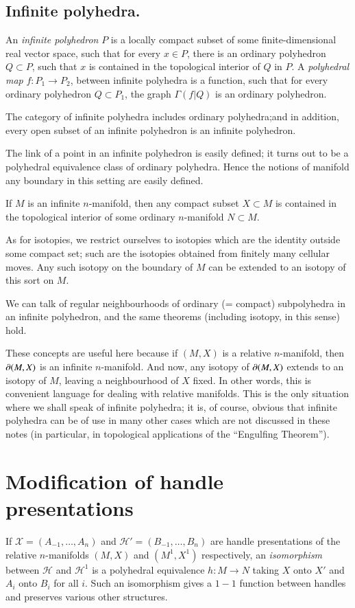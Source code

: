 \subsection{Infinite polyhedra.}\label{chap8-sec8.3.8}
An {\em infinite polyhedron} $P$ is a locally compact subset of some finite-dimensional real vector space, such that for every $x\in P$, there is an ordinary polyhedron $Q\subset P$, such that $x$ is contained in the topological interior of $Q$ in $P$. A {\em polyhedral map} $f:P_{1}\to P_{2}$, between infinite polyhedra is a function, such that for every ordinary polyhedron $Q\subset P_{1}$, the graph $\Gamma(f|Q)$ is an ordinary polyhedron.

The category of infinite polyhedra includes ordinary polyhedra;\pageoriginale and in addition, every open subset of an infinite polyhedron is an infinite polyhedron.

The link of a point in an infinite polyhedron is easily defined; it turns out to be a polyhedral equivalence class of ordinary polyhedra. Hence the notions of manifold any boundary in this setting are easily defined.

If $M$ is an infinite $n$-manifold, then any compact subset $X\subset M$ is contained in the topological interior of some ordinary $n$-manifold $N\subset M$.

As for isotopies, we restrict ourselves to isotopies which are the identity outside some compact set; such are the isotopies obtained from finitely many cellular moves. Any such isotopy on the boundary of $M$ can be extended to an isotopy of this sort on $M$.

We can talk of regular neighbourhoods of ordinary (= compact) subpolyhedra in an infinite polyhedron, and the same theorems (including isotopy, in this sense) hold.

These concepts are useful here because if $(M,X)$ is a relative $n$-manifold, then $\partial (M,X)$ is an infinite $n$-manifold. And now, any isotopy of $\partial(M,X)$ extends to an isotopy of $M$, leaving a neighbourhood of $X$ fixed. In other words, this is convenient language for dealing with relative manifolds. This is the only situation where we shall speak of infinite polyhedra; it is, of course, obvious that infinite polyhedra can be of use in many other cases which are not discussed in these notes (in particular, in topological applications of the ``Engulfing Theorem'').

\section{Modification of handle presentations}\label{chap8-sec8.4}\pageoriginale
If $\mathscr{X}=(A_{-1},\ldots,A_{n})$ and $\mathscr{H}'=(B_{-1},\ldots,B_{n})$ are handle presentations of the relative $n$-manifolds $(M,X)$ and $(M^{1},X^{1})$ respectively, an {\em isomorphism} between $\mathscr{H}$ and $\mathscr{H}^{1}$ is a polyhedral equivalence $h:M\to N$ taking $X$ onto $X'$ and $A_{i}$ onto $B_{i}$ for all $i$. Such an isomorphism gives a $1-1$ function between handles and preserves various other structures.

